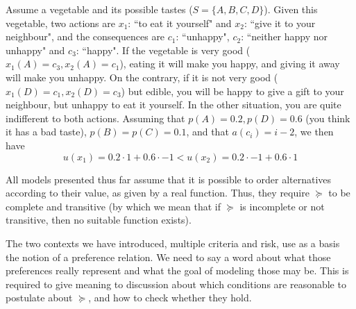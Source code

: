 \documentclass[french, english]{llncs}
\begin{document}
	\begin{example}\label{exm:DMU}
		Assume a vegetable and its possible tastes ($S=\{A,B,C,D\}$). Given this vegetable, two actions are $x_1$: ``to eat it yourself" and $x_2$: ``give it to your neighbour", and the consequences are $c_1$: ``unhappy", $c_2$: ``neither happy nor unhappy" and $c_3$: ``happy". If the vegetable is very good ($x_1(A)=c_3,x_2(A)=c_1$), eating it will make you happy,  and giving it away will make you unhappy. On the contrary, if it is not very good ($x_1(D)=c_1,x_2(D)=c_3$) but edible, you will be happy to give a gift to your neighbour, but unhappy to eat it yourself. In the other situation, you are quite indifferent to both actions. Assuming that $p(A)=0.2, p(D)=0.6$ (you think it has a bad taste), $p(B)=p(C)=0.1$, and that $a(c_i)=i-2$, we then have
		$$u(x_1)=0.2 \cdot 1 + 0.6 \cdot -1 <  u(x_2)=0.2 \cdot -1 + 0.6 \cdot 1$$
	\end{example}
	
	
	All models presented thus far assume that it is possible to order alternatives according to their value, as given by a real function. Thus, they require $\succeq$ to be complete and transitive (by which we mean that if $\succeq$ is incomplete or not transitive, then no suitable function exists).
	
	The two contexts we have introduced, multiple criteria and risk, use as a basis the notion of a preference relation. We need to say a word about what those preferences really represent and what the goal of modeling those may be. This is required to give meaning to discussion about which conditions are reasonable to postulate about $\succeq$, and how to check whether they hold.
	
\end{document}
